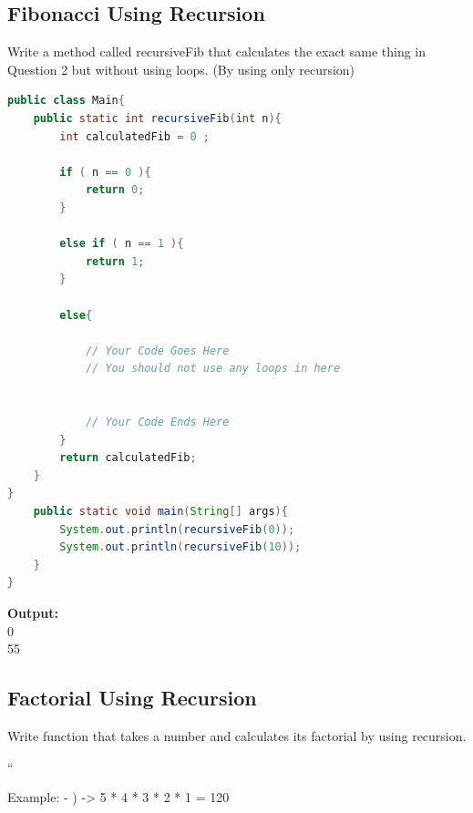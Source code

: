 \documentclass[12pt , a4paper]{article}
\begin{document}
	\newpage
	\subsection{Fibonacci Using Recursion}
Write a method called recursiveFib that calculates the exact same thing in Question 2 but without using loops. (By using only recursion)
	\begin{lstlisting}[language=Java]
public class Main{
	public static int recursiveFib(int n){
		int calculatedFib = 0 ;

		if ( n == 0 ){
			return 0;
		}
		
		else if ( n == 1 ){
			return 1;
		}

		else{

			// Your Code Goes Here
			// You should not use any loops in here


			// Your Code Ends Here	
		}
		return calculatedFib;
	}
}
	public static void main(String[] args){
		System.out.println(recursiveFib(0));		
		System.out.println(recursiveFib(10));		
	}
}
	\end{lstlisting}
	\begin{tcolorbox}
	\textbf{Output:}\\
	0\\
	55\\
	\end{tcolorbox}

	\newpage
	\subsection{Factorial Using Recursion}
Write function that takes a number and calculates its factorial by using recursion.


``

Example:
- ) -> 5 * 4 * 3 * 2 * 1 = 120
\end{document}
